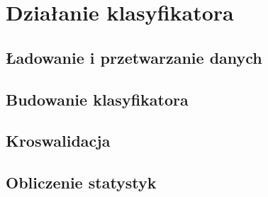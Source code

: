 \chapter{Działanie klasyfikatora}
	\section{Ładowanie i przetwarzanie danych}
	\section{Budowanie klasyfikatora}
	\section{Kroswalidacja}
	\section{Obliczenie statystyk}